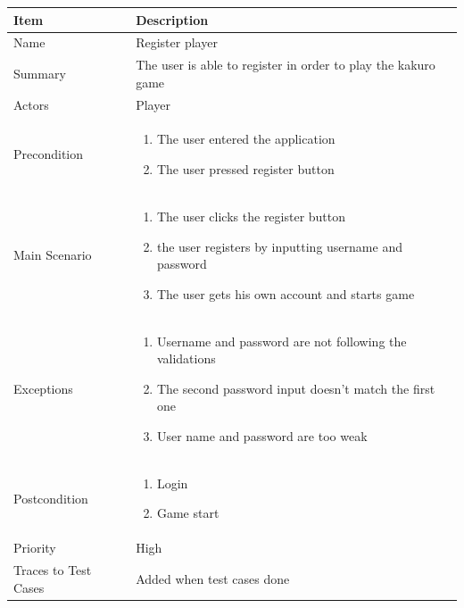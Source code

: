 \documentclass[12pt]{article}
\begin{document}
\begin{center}
\setlength{\tabcolsep}{18pt}
\renewcommand{\arraystretch}{1.3}
\begin{tabular}{ |p{3cm}|p{10cm}| }
    \hline
    \rowcolor{green}
   Item & Description \\
    \hline
    Name & Register player \\
    \hline
    Summary & The user is able to register in order to play the kakuro game \\
    \hline
    Actors & Player \\
    \hline
    Precondition & 
    \vspace*{-0.2in}
    \begin{enumerate}
        \item The user entered the application
        \item The user pressed register button
    \end{enumerate}  \\
    \hline
    Main Scenario &     
    \vspace*{-0.2in}
    \begin{enumerate}
        \item The user clicks the register button
        \item the user registers by inputting username and password
        \item The user gets his own account and starts game
    \end{enumerate}  \\
    \hline
    Exceptions & 
    \vspace*{-0.2in}
    \begin{enumerate}
        \item Username and password are not following the validations
        \item The second password input doesn't match the first one
        \item User name and password are too weak
    \end{enumerate}  \\
    \hline
    Postcondition &
    \vspace*{-0.2in}
    \begin{enumerate}
        \item Login
        \item Game start
    \end{enumerate}  \\
    \hline
    Priority & High \\
    \hline
    Traces to Test Cases & Added when test cases done  \\
    \hline
\end{tabular}
\end{center}
\end{document}
